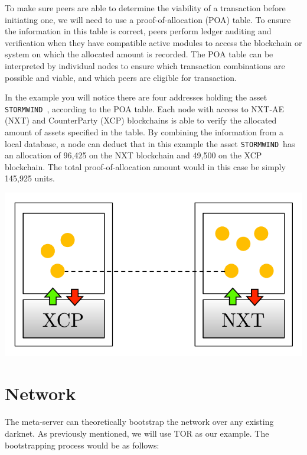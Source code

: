 \documentclass[a4paper,fullpack]{article}
\newcommand{\stormwind}{\texttt{STORMWIND}\, }
\begin{document}
To make sure peers are able to determine the viability of a transaction before initiating one, we will need to use a proof-of-allocation (POA) table. To ensure the information in this table is correct, peers perform ledger auditing and verification when they have compatible active modules to access the blockchain or system on which the allocated amount is recorded. The POA table can be interpreted by individual nodes to ensure which transaction combinations are possible and viable, and which peers are eligible for transaction.

In the example you will notice there are four addresses holding the asset \stormwind, according to the POA table. Each node with access to NXT-AE (NXT) and CounterParty (XCP) blockchains is able to verify the allocated amount of assets specified in the table. By combining the information from a local database, a node can deduct that in this example the asset \stormwind has an allocation of 96,425 on the NXT blockchain and 49,500 on the XCP blockchain. The total proof-of-allocation amount would in this case be simply 145,925 units.

\includegraphics[width=.9\textwidth]{images/forumimg_valuetokens.pdf}

\section{Network}

The meta-server can theoretically bootstrap the network over any existing darknet. As previously mentioned, we will use TOR as our example. The bootstrapping process would be as follows:
\end{document}
